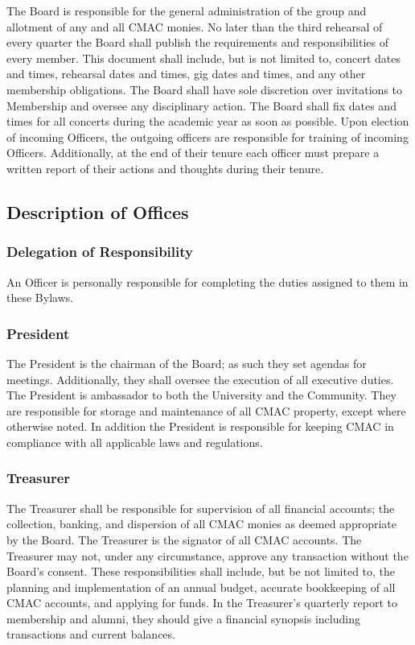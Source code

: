 \documentclass{article}
\begin{document}
The Board is responsible for the general administration of the group
and allotment of any and all CMAC monies. No later than the third
rehearsal of every quarter the Board shall publish the requirements
and responsibilities of every member. This document shall include,
but is not limited to, concert dates and times, rehearsal dates and
times, gig dates and times, and any other membership obligations.
The Board shall have sole discretion over invitations to Membership
and oversee any disciplinary action. The Board shall fix dates and
times for all concerts during the academic year as soon as possible.
Upon election of incoming Officers, the outgoing officers are responsible
for training of incoming Officers. Additionally, at the end of their
tenure each officer must prepare a written report of their actions
and thoughts during their tenure.

\subsection{Description of Offices}

\subsubsection{Delegation of Responsibility}

An Officer is personally responsible for completing the duties assigned
to them in these Bylaws.

\subsubsection{President}

The President is the chairman of the Board; as such they set agendas for
meetings. Additionally, they shall oversee the execution of all executive
duties. The President is ambassador to both the University and the
Community. They are responsible for storage and maintenance of all CMAC
property, except where otherwise noted. In addition the President is responsible
for keeping CMAC in compliance with all applicable laws and regulations.

\subsubsection{Treasurer}

The Treasurer shall be responsible for supervision of all financial accounts;
the collection, banking, and dispersion of all CMAC monies as deemed appropriate
by the Board. The Treasurer is the signator of all CMAC accounts. The Treasurer
may not, under any circumstance, approve any transaction without the Board's
consent. These responsibilities shall include, but be not limited to, the
planning and implementation of an annual budget, accurate bookkeeping of all
CMAC accounts, and applying for funds. In the Treasurer's quarterly report to
membership and alumni, they should give a financial synopsis including
transactions and current balances.
\end{document}
